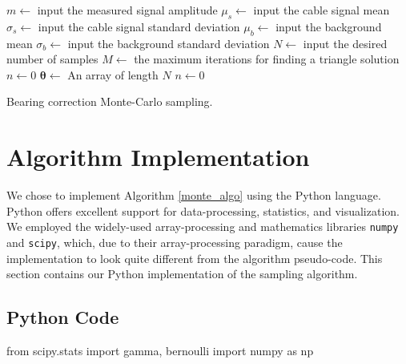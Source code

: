 \documentclass[paper=a4, fontsize=11pt]{scrartcl}
\numberwithin{equation}{section}		%
\numberwithin{figure}{section}			%
\numberwithin{table}{section}				%
\begin{document}
\begin{appendices}
\pagebreak
\begin{algorithm}[H] \label{monte_algo}
\SetAlgoLined
{}
 $m \gets$ input the measured signal amplitude\;
 $\mu_s \gets$ input the cable signal mean\;
 $\sigma_s \gets$ input the cable signal standard deviation\;
 $\mu_b \gets$ input the background mean\;
 $\sigma_b \gets$ input the background standard deviation\;
 $N \gets$ input the desired number of samples\;
 $M \gets$ the maximum iterations for finding a triangle solution\;
 $n \gets 0$\;
 $\bm{\theta} \gets$ An array of length $N$\;
 $n \gets 0$\;
 \caption{Bearing correction Monte-Carlo sampling.}
\end{algorithm}

\pagebreak
\section{Algorithm Implementation}
We chose to implement Algorithm \ref{monte_algo} using the Python language.  Python offers excellent support for data-processing, statistics, and visualization.  We employed the widely-used array-processing and mathematics libraries \texttt{numpy} and \texttt{scipy}, which, due to their array-processing paradigm,  cause the implementation to look quite different from the algorithm pseudo-code.  This section contains our Python implementation of the sampling algorithm.

\subsection{Python Code}

\begin{python}
from scipy.stats import gamma, bernoulli
import numpy as np


\end{python}
\end{appendices}
\end{document}
